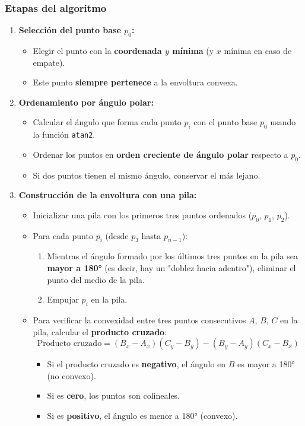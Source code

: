 \documentclass[12pt]{book}
\theoremstyle{definition}
\theoremstyle{plain}
\theoremstyle{remark}
\begin{document}
\subsubsection{Etapas del algoritmo}

\begin{enumerate}
    \item \textbf{Selección del punto base \( p_0 \):}
    \begin{itemize}
        \item Elegir el punto con la \textbf{coordenada \( y \) mínima} (y \( x \) mínima en caso de empate).
        \item Este punto \textbf{siempre pertenece} a la envoltura convexa.
    \end{itemize}

    \item \textbf{Ordenamiento por ángulo polar:}
    \begin{itemize}
        \item Calcular el ángulo que forma cada punto \( p_i \) con el punto base \( p_0 \) usando la función \texttt{atan2}.
        \item Ordenar los puntos en \textbf{orden creciente de ángulo polar} respecto a \( p_0 \).
        \item Si dos puntos tienen el mismo ángulo, conservar el más lejano.
    \end{itemize}

    \item \textbf{Construcción de la envoltura con una pila:}
    \begin{itemize}
        \item Inicializar una pila con los primeros tres puntos ordenados (\( p_0 \), \( p_1 \), \( p_2 \)).
        \item Para cada punto \( p_i \) (desde \( p_3 \) hasta \( p_{n-1} \)):
        \begin{enumerate}
            \item Mientras el ángulo formado por los últimos tres puntos en la pila sea \textbf{mayor a 180°} (es decir, hay un "doblez hacia adentro"), eliminar el punto del medio de la pila.
            \item Empujar \( p_i \) en la pila.
        \end{enumerate}
        \item Para verificar la convexidad entre tres puntos consecutivos \( A \), \( B \), \( C \) en la pila, calcular el \textbf{producto cruzado}:
        \[
        \text{Producto cruzado} = (B_x - A_x)(C_y - B_y) - (B_y - A_y)(C_x - B_x)
        \]
        \begin{itemize}
            \item Si el producto cruzado es \textbf{negativo}, el ángulo en \( B \) es mayor a 180° (no convexo).
            \item Si es \textbf{cero}, los puntos son colineales.
            \item Si es \textbf{positivo}, el ángulo es menor a 180° (convexo).
        \end{itemize}
    \end{itemize}
\end{enumerate}
\end{document}
